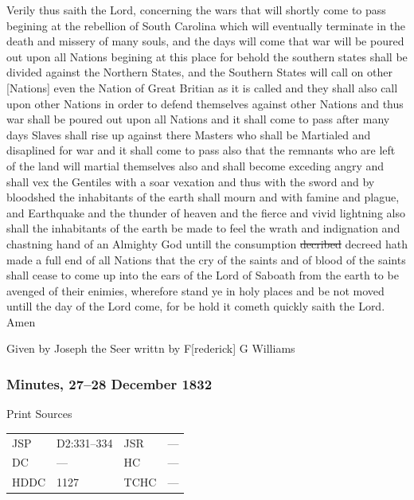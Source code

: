 				Verily thus saith the Lord, concerning the wars that will shortly come to pass begining at the rebellion of South Carolina which will eventually terminate in the death and missery of many souls, and the days will come that war will be poured out upon all Nations begining at this place for behold the southern states shall be divided against the Northern States, and the Southern States will call on other [Nations] even the Nation of Great Britian as it is called and they shall also call upon other Nations in order to defend themselves against other Nations and thus war shall be poured out upon all Nations and it shall come to pass after many days Slaves shall rise up against there Masters who shall be Martialed and disaplined for war and it shall come to pass also that the remnants who are left of the land will martial themselves also and shall become exceding angry and shall vex the Gentiles with a soar vexation and thus with the sword and by bloodshed the inhabitants of the earth shall mourn and with famine and plague, and Earthquake and the thunder of heaven and the fierce and vivid lightning also shall the inhabitants of the earth be made to feel the wrath and indignation and chastning hand of an Almighty God untill the consumption \sout{decribed} decreed hath made a full end of all Nations that the cry of the saints and of blood of the saints shall cease to come up into the ears of the Lord of Saboath from the earth to be avenged of their enimies, wherefore stand ye in holy places and be not moved untill the day of the Lord come, for be hold it cometh quickly saith the Lord. Amen
				
				Given by Joseph the Seer writtn by F[rederick] G Williams
				
		\subsubsection{Minutes, 27--28 December 1832}
			\label{EMS-1832-JS-27-28-DEC-1832-MIN}
		
			\begin{description}
				\item[Print Sources]
			\end{description}

				\begin{tabular}{p{0.5in}p{1in}p{0.5in}p{1in}}
				JSP	 	& D2:331--334		& JSR 		& --- \\
				DC	 	& ---	 	& HC 		& --- \\
				HDDC 	& 1127		& TCHC 		& --- \\
				\end{tabular}
			

